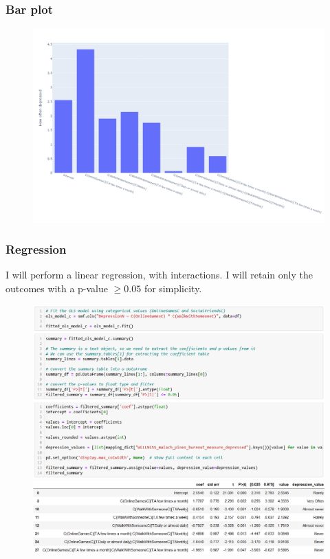 \documentclass{beamer}
\begin{document}
\begin{frame}
    \frametitle{Bar plot}

    \begin{figure}
        \centering
        \includegraphics[width=1\linewidth]{jason_barplot.png}
    \end{figure}

\end{frame}


\begin{frame}

\frametitle{Regression}

I will perform a linear regression, with interactions. I will retain only the outcomes with a p-value $\geq 0.05$ for simplicity.

\begin{figure}
    \centering
    \includegraphics[width=0.6\linewidth]{jason_regression.png}
    \includegraphics[width=0.6\linewidth]{jason_regressionoutcome.png}
\end{figure}

\end{frame}
\end{document}
